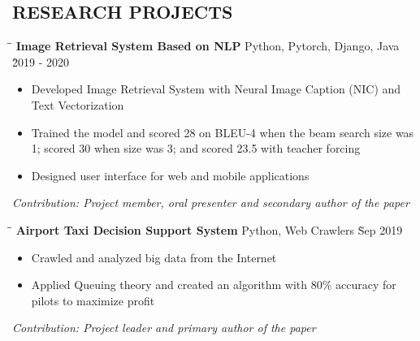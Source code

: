 \documentclass{res}
\begin{document}
\begin{resume}
\vspace{-0.12in}
\section{RESEARCH PROJECTS}
    \vspace{-0.1in}	
    \begin{tabbing}
    \hspace{3in}\= \hspace{2in}\= \kill %
    {\bf Image Retrieval System Based on NLP} \> Python, Pytorch, Django, Java \` 2019 - 2020 \\
    \end{tabbing}\vspace{-20pt}      %
    \begin{itemize} \itemsep -2pt %
    \item Developed Image Retrieval System with Neural Image Caption (NIC) and Text Vectorization
    \item Trained the model and scored 28 on BLEU-4 when the beam search size was 1; scored 30 when size was 3; and scored 23.5 with teacher forcing
    \item Designed user interface for web and mobile applications 
    \end{itemize}
    \vspace{-0.17in}
    {\sl Contribution: Project member, oral presenter and secondary author of the paper}
    \vspace{-0.2in}	 
    \begin{tabbing}
    \hspace{3in}\= \hspace{2in}\= \kill %
    {\bf Airport Taxi Decision Support System} \> Python, Web Crawlers \` Sep 2019 \\
    \end{tabbing}\vspace{-20pt}      %
    \begin{itemize} \itemsep -2pt %
    \item Crawled and analyzed big data from the Internet
    \item Applied Queuing theory and created an algorithm with 80\% accuracy for pilots to maximize profit
    \end{itemize}
    \vspace{-0.17in}
    {\sl Contribution: Project leader and primary author of the paper} 

\end{resume}
\end{document}
